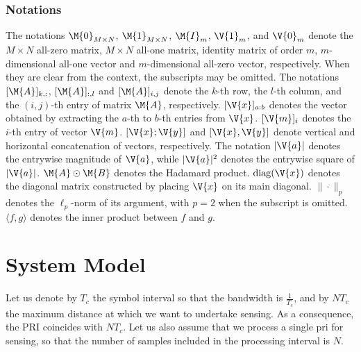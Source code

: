 \documentclass[journal,a4paper,10pt, romanappendices]{IEEEtran}
\begin{document}
\subsubsection*{Notations}
The notations $\M{0}_{M\times N}$, $\M{1}_{M\times N}$, $\M{I}_{m}$, $\V{1}_{m}$, and $\V{0}_{m}$ denote the $M\times N$ all-zero matrix, $M\times N$ all-one matrix, identity matrix of order $m$, $m$-dimensional all-one vector and $m$-dimensional all-zero vector, respectively. When they are clear from the context, the subscripts may be omitted. The notations $[\M{A}]_{k,:}$, $[\M{A}]_{:,l}$ and $[\M{A}]_{i,j}$ denote the $k$-th row, the $l$-th column, and the $(i,j)$-th entry of matrix $\M{A}$, respectively. $[\V{x}]_{a:b}$ denotes the vector obtained by extracting the $a$-th to $b$-th entries from $\V{x}$. $[\V{m}]_i$ denotes the $i$-th entry of vector $\V{m}$. $[\V{x};\V{y}]$ and $[\V{x},\V{y}]$ denote vertical and horizontal concatenation of vectors, respectively. The notation $|\V{a}|$ denotes the entrywise magnitude of $\V{a}$, while $|\V{a}|^2$ denotes the entrywise square of $|\V{a}|$. $\M{A}\odot\M{B}$ denotes the Hadamard product. ${\rm diag}(\V{x})$ denotes the diagonal matrix constructed by placing $\V{x}$ on its main diagonal. $\|\cdot\|_p$ denotes the $\ell_p$-norm of its argument, with $p=2$ when the subscript is omitted. $\langle f,g\rangle$ denotes the inner product between $f$ and $g$.

\section{System Model}\label{sec:model}
Let us denote by $T_c$ the symbol interval so that the bandwidth is $\frac{1}{T_c}$, and by $NT_c$ the maximum distance at which we want to undertake sensing. As a consequence, the PRI coincides with $NT_c$. Let us also assume that we process a single \ac{pri} for sensing, so that the number of samples included in the processing interval is $N$. 
\end{document}
